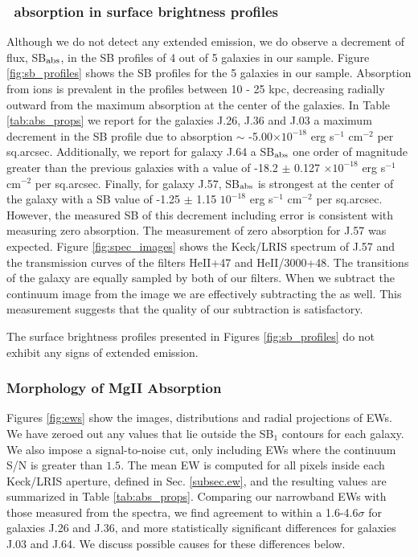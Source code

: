 \documentclass[twocolumn]{aastex61}
\begin{document}
\subsubsection{\ absorption in surface brightness profiles} \label{subsubsec:SBprofiles}
Although we do not detect any extended  emission, we do observe a decrement of flux, SB$_{\rm abs}$, in the SB profiles of 4 out of 5 galaxies in our sample. Figure \ref{fig:sb_profiles} shows the SB profiles for the 5 galaxies in our sample. Absorption from  ions is prevalent in the profiles between 10 - 25 kpc, decreasing radially outward from the maximum absorption at the center of the galaxies. In Table \ref{tab:abs_props} we report for the galaxies J.26, J.36 and J.03 a maximum decrement in the SB profile due to absorption $\sim$ -5.00$\times10^{-18}$ erg s$^{-1}$ cm$^{-2}$ per sq.arcsec. Additionally, we report for galaxy J.64 a SB$_{\rm abs}$ one order of magnitude greater than the previous galaxies with a value of -18.2 $\pm$ 0.127 $\times10^{-18}$ erg s$^{-1}$ cm$^{-2}$ per sq.arcsec. Finally, for galaxy J.57, SB$_{\rm abs}$ is strongest at the center of the galaxy with a SB value of -1.25 $\pm$ 1.15 $10^{-18}$ erg s$^{-1}$ cm$^{-2}$ per sq.arcsec. However, the measured SB of this decrement including error is consistent with measuring zero absorption. The measurement of zero absorption for J.57 was expected. Figure \ref{fig:spec_images} shows the Keck/LRIS spectrum of J.57 and the transmission curves of the filters HeII+47 and HeII/3000+48. The  transitions of the galaxy are equally sampled by both of our filters. When we subtract the continuum image from the  image we are effectively subtracting the  as well. This measurement suggests that the quality of our subtraction is satisfactory.  


The surface brightness profiles presented in Figures \ref{fig:sb_profiles} do not exhibit any signs of extended  emission.

\subsubsection{Morphology of MgII Absorption}
Figures \ref{fig:ews}  show the images, distributions and radial projections of  EWs. We have zeroed out any values that lie outside the SB$_1$ contours for each galaxy. We also impose a signal-to-noise cut, only including EWs where the continuum S/N is greater than $1.5$. The mean EW is computed for all pixels inside each Keck/LRIS aperture, defined in Sec. \ref{subsec.ew}, and the resulting values are summarized in Table \ref{tab:abs_props}. Comparing our narrowband EWs with those measured from the spectra, we find agreement to within a 1.6-4.6$\sigma$ for galaxies J.26 and J.36, and more statistically significant differences for galaxies J.03 and J.64. We discuss possible causes for these differences below.
\end{document}
